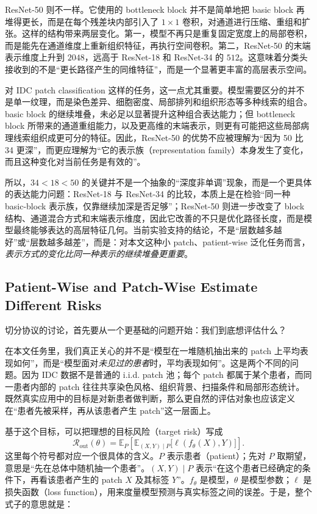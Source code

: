 ResNet-50 则不一样。它使用的 bottleneck block 并不是简单地把 basic block 再堆得更长，而是在每个残差块内部引入了 $1\times1$ 卷积，对通道进行压缩、重组和扩张。这样的结构带来两层变化。第一，模型不再只是重复固定宽度上的局部卷积，而是能先在通道维度上重新组织特征，再执行空间卷积。第二，ResNet-50 的末端表示维度上升到 $2048$，远高于 ResNet-18 和 ResNet-34 的 $512$。这意味着分类头接收到的不是“更长路径产生的同维特征”，而是一个显著更丰富的高层表示空间。

对 IDC patch classification 这样的任务，这一点尤其重要。模型需要区分的并不是单一纹理，而是染色差异、细胞密度、局部排列和组织形态等多种线索的组合。basic block 的继续堆叠，未必足以显著提升这种组合表达能力；但 bottleneck block 所带来的通道重组能力，以及更高维的末端表示，则更有可能把这些局部病理线索组织成更可分的特征。因此，ResNet-50 的优势不应被理解为“因为 50 比 34 更深”，而更应理解为“它的表示族（representation family）本身发生了变化，而且这种变化对当前任务是有效的”。

所以，$34 < 18 < 50$ 的关键并不是一个抽象的“深度非单调”现象，而是一个更具体的表达能力问题：ResNet-18 与 ResNet-34 的比较，本质上是在检验“同一种 basic-block 表示族，仅靠继续加深是否足够”；ResNet-50 则进一步改变了 block 结构、通道混合方式和末端表示维度，因此它改善的不只是优化路径长度，而是模型最终能够表达的高层特征几何。当前实验支持的结论，不是“层数越多越好”或“层数越多越差”，而是：对本文这种小 patch、patient-wise 泛化任务而言，\emph{表示方式的变化比同一种表示的继续堆叠更重要}。

\subsection{Patient-Wise and Patch-Wise Estimate Different Risks}

切分协议的讨论，首先要从一个更基础的问题开始：我们到底想评估什么？

在本文任务里，我们真正关心的并不是“模型在一堆随机抽出来的 patch 上平均表现如何”，而是“模型面对\emph{未见过的患者}时，平均表现如何”。这是两个不同的问题。因为 IDC 数据不是普通的 i.i.d. patch 池；每个 patch 都属于某个患者，而同一患者内部的 patch 往往共享染色风格、组织背景、扫描条件和局部形态统计。既然真实应用中的目标是对新患者做判断，那么更自然的评估对象也应该定义在“患者先被采样，再从该患者产生 patch”这一层面上。

基于这个目标，可以把理想的目标风险（target risk）写成
\begin{equation}
    \mathcal{R}_{\mathrm{out}}(\theta)
    =
    \mathbb{E}_{P}
    \left[
        \mathbb{E}_{(X,Y)\mid P}
        \bigl[
            \ell(f_{\theta}(X),Y)
            \bigr]
        \right].
\end{equation}
这里每个符号都对应一个很具体的含义。$P$ 表示患者（patient）；先对 $P$ 取期望，意思是“先在总体中随机抽一个患者”。$(X,Y)\mid P$ 表示“在这个患者已经确定的条件下，再看该患者产生的 patch $X$ 及其标签 $Y$”。$f_{\theta}$ 是模型，$\theta$ 是模型参数；$\ell$ 是损失函数（loss function），用来度量模型预测与真实标签之间的误差。于是，整个式子的意思就是：

